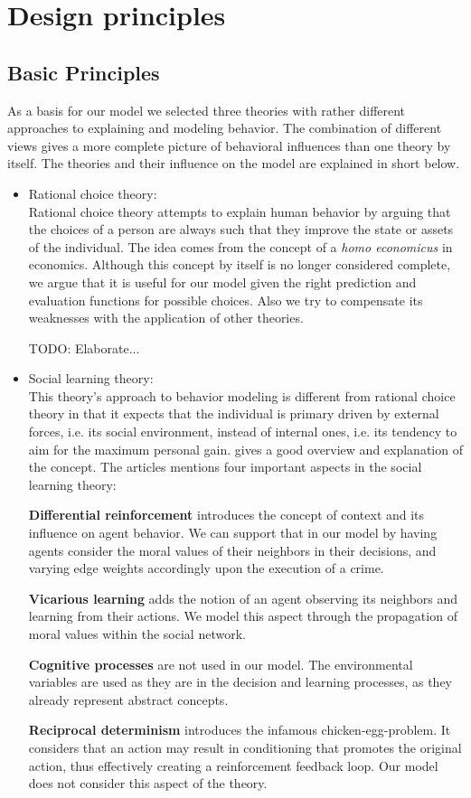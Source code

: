 \documentclass{article}
\begin{document}
	\section{Design principles}
		\subsection{Basic Principles}
			As a basis for our model we selected three theories with rather different
			approaches to explaining and modeling behavior. The combination of different
			views gives a more complete picture of behavioral influences than one theory by
			itself. The theories and their influence on the model are explained in short below.
			\begin{itemize}
				\item Rational choice theory:\\
					Rational choice theory attempts to explain human behavior by
					arguing that the choices of a person are always such that they improve the
					state or assets of the individual.\cite{rationalchoice} The idea comes from
					the concept of a \textit{homo economicus} in economics. Although this concept
					by itself is no longer considered complete, we argue that it is useful for our
					model given the right prediction and evaluation functions for possible choices.
					Also we try to compensate its weaknesses with the application of other
					theories.
					\par TODO: Elaborate...

				\item Social learning theory:\\
					This theory's approach to behavior modeling is different from rational choice
					theory in that it expects that the individual is primary driven by external
					forces, i.e. its social environment, instead of internal ones, i.e. its
					tendency to aim for the maximum personal gain. \cite{sociallearning} gives
					a good overview and explanation of the concept. The articles mentions four
					important aspects in the social learning theory:\par
					\textbf{Differential reinforcement} introduces the concept of context and its
					influence on agent behavior. We can support that in our model by having
					agents consider the moral values of their neighbors in their decisions, and
					varying edge weights accordingly upon the execution of a crime.\par
					\textbf{Vicarious learning} adds the notion of an agent observing its neighbors and
					learning from their actions. We model this aspect through the propagation
					of moral values within the social network.\par
					\textbf{Cognitive processes} are not used in our model. The environmental
					variables are used as they are in the decision and learning processes, as they
					already represent abstract concepts.\par
					\textbf{Reciprocal determinism} introduces the infamous chicken-egg-problem.
					It considers that an action may result in conditioning that promotes the
					original action, thus effectively creating a reinforcement feedback loop.
					Our model does not consider this aspect of the theory.


\end{itemize}
\end{document}
